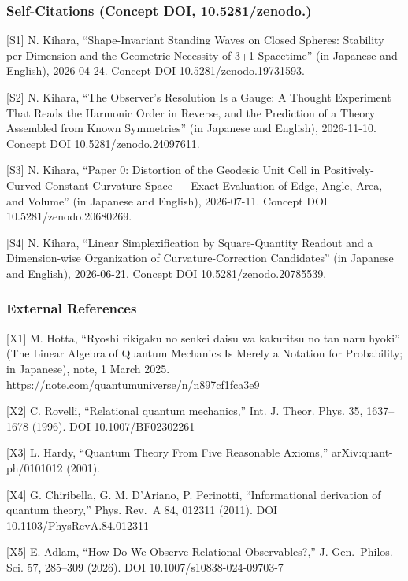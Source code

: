 \documentclass[
  a4paper,
]{article}
\begin{document}
\subsubsection{Self-Citations (Concept DOI,
10.5281/zenodo.)}\label{self-citations-concept-doi-10.5281zenodo.}

{[}S1{]} N. Kihara, ``Shape-Invariant Standing Waves on Closed Spheres:
Stability per Dimension and the Geometric Necessity of 3+1 Spacetime''
(in Japanese and English), 2026-04-24. Concept DOI
10.5281/zenodo.19731593.

{[}S2{]} N. Kihara, ``The Observer's Resolution Is a Gauge: A Thought
Experiment That Reads the Harmonic Order in Reverse, and the Prediction
of a Theory Assembled from Known Symmetries'' (in Japanese and English),
2026-11-10. Concept DOI 10.5281/zenodo.24097611.

{[}S3{]} N. Kihara, ``Paper 0: Distortion of the Geodesic Unit Cell in
Positively-Curved Constant-Curvature Space --- Exact Evaluation of Edge,
Angle, Area, and Volume'' (in Japanese and English), 2026-07-11. Concept
DOI 10.5281/zenodo.20680269.

{[}S4{]} N. Kihara, ``Linear Simplexification by Square-Quantity Readout
and a Dimension-wise Organization of Curvature-Correction Candidates''
(in Japanese and English), 2026-06-21. Concept DOI
10.5281/zenodo.20785539.

\subsubsection{External References}\label{external-references}

{[}X1{]} M. Hotta, ``Ryoshi rikigaku no senkei daisu wa kakuritsu no tan
naru hyoki'' (The Linear Algebra of Quantum Mechanics Is Merely a
Notation for Probability; in Japanese), note, 1 March 2025.
\url{https://note.com/quantumuniverse/n/n897cf1fca3e9}

{[}X2{]} C. Rovelli, ``Relational quantum mechanics,'' Int. J. Theor.
Phys. 35, 1637--1678 (1996). DOI 10.1007/BF02302261

{[}X3{]} L. Hardy, ``Quantum Theory From Five Reasonable Axioms,''
arXiv:quant-ph/0101012 (2001).

{[}X4{]} G. Chiribella, G. M. D'Ariano, P. Perinotti, ``Informational
derivation of quantum theory,'' Phys. Rev.~A 84, 012311 (2011). DOI
10.1103/PhysRevA.84.012311

{[}X5{]} E. Adlam, ``How Do We Observe Relational Observables?,'' J.
Gen.~Philos. Sci. 57, 285--309 (2026). DOI 10.1007/s10838-024-09703-7
\end{document}
